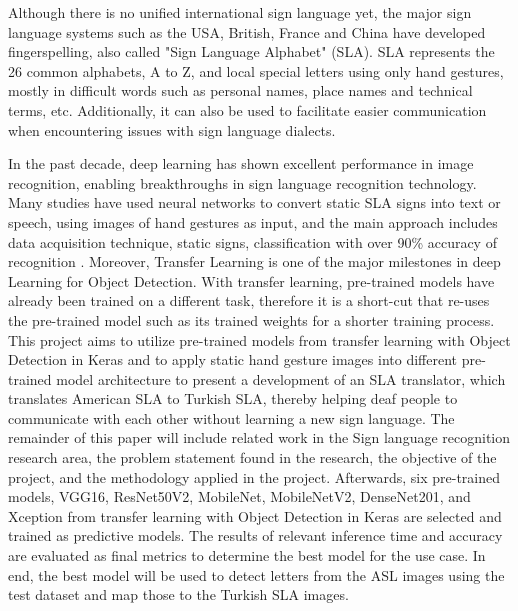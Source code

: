 \documentclass[a4paper]{article}
\begin{document}
Although there is no unified international sign language yet, the major sign language systems such as the USA, British, France and China have developed fingerspelling, also called "Sign Language Alphabet" (SLA). SLA represents the 26 common alphabets, A to Z, and local special letters using only hand gestures, mostly in difficult words such as personal names, place names and technical terms, etc. Additionally, it can also be used to facilitate easier communication when encountering issues with sign language dialects. 

In the past decade, deep learning has shown excellent performance in image recognition, enabling breakthroughs in sign language recognition technology. Many studies have used neural networks to convert static SLA signs into text or speech, using images of hand gestures as input, and the main approach includes data acquisition technique, static signs, classification with over 90\% accuracy of recognition \cite{wadhawan2021sign}. Moreover, Transfer Learning is one of the major milestones in deep Learning for Object Detection. With transfer learning, pre-trained models have already been trained on a different task, therefore it is a short-cut that re-uses the pre-trained model such as its trained weights for a shorter training process. This project aims to utilize pre-trained models from transfer learning with Object Detection in Keras and to apply static hand gesture images into different pre-trained model architecture to present a development of an SLA translator, which translates American SLA to Turkish SLA, thereby helping deaf people to communicate with each other without learning a new sign language. The remainder of this paper will include related work in the Sign language recognition research area, the problem statement found in the research, the objective of the project, and the methodology applied in the project. Afterwards, six pre-trained models, VGG16, ResNet50V2, MobileNet, MobileNetV2, DenseNet201, and Xception from transfer learning with Object Detection in Keras are selected and trained as predictive models. The results of relevant inference time and accuracy are evaluated as final metrics to determine the best model for the use case. In end, the best model will be used to detect letters from the ASL images using the test dataset and map those to the Turkish SLA images.
  
\end{document}

